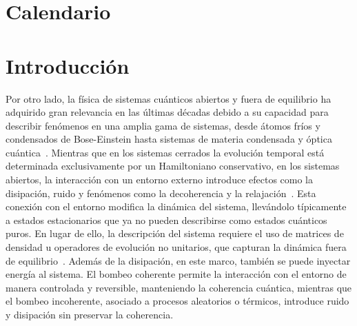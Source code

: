 \documentclass[onecolumn,notitlepage,letterpaper,aps,pra,12pt]{article}
\numberwithin{equation}{section}
\begin{document}
\section{Calendario}





\clearpage
\section{Introducción}





Por otro lado, la física de sistemas cuánticos abiertos y fuera de equilibrio ha adquirido gran relevancia en las últimas décadas debido a su capacidad para describir fenómenos en una amplia gama de sistemas, desde átomos fríos y condensados de Bose-Einstein hasta sistemas de  materia condensada y óptica cuántica~\cite{rotter2015}.
Mientras que en los sistemas cerrados la evolución temporal está determinada exclusivamente por un Hamiltoniano conservativo, en los sistemas abiertos, la interacción con un entorno externo introduce efectos como la disipación, ruido y fenómenos  como la decoherencia y la relajación~\cite{Sieberer2016}. Esta conexión con el entorno modifica la dinámica del sistema, llevándolo típicamente a estados estacionarios que ya no pueden describirse como estados cuánticos puros. En lugar de ello, la descripción del sistema requiere el uso de matrices de densidad u operadores de evolución no unitarios, que capturan la dinámica fuera de equilibrio~\cite{breuer2003}.  Además de la disipación, en este marco, también se puede inyectar energía al sistema. El bombeo coherente permite la interacción con el entorno de manera controlada y reversible, manteniendo la coherencia cuántica, mientras que el bombeo incoherente, asociado a procesos aleatorios o térmicos, introduce ruido y disipación sin preservar la coherencia.
\end{document}
